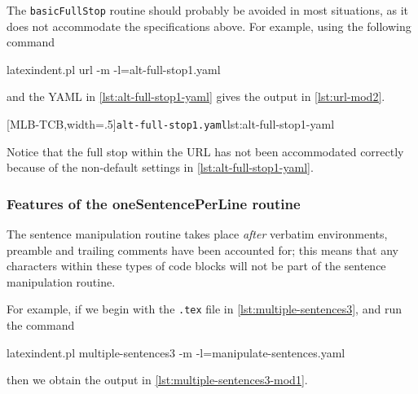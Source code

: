 	The \texttt{basicFullStop} routine should probably be avoided in most situations, as it
	does not accommodate the specifications above. For example, using the following command
	 
	\begin{commandshell}
latexindent.pl url -m -l=alt-full-stop1.yaml
\end{commandshell}
	and the YAML in \cref{lst:alt-full-stop1-yaml} gives the output in \cref{lst:url-mod2}.

	\begin{cmhtcbraster}[ raster left skip=-3.5cm,
			raster right skip=-2cm,
			raster force size=false,
			raster column 1/.style={add to width=.1\textwidth},
			raster column skip=.06\linewidth]
		[MLB-TCB,width=.5\textwidth]{\texttt{alt-full-stop1.yaml}}{lst:alt-full-stop1-yaml}
	\end{cmhtcbraster}

	Notice that the full stop within the URL has not been accommodated correctly because of
	the non-default settings in \cref{lst:alt-full-stop1-yaml}.

\subsubsection{Features of the oneSentencePerLine routine}
	The sentence manipulation routine takes place \emph{after} verbatim  environments, preamble and trailing comments have been
	accounted for; this means that any characters within these types of code blocks will not
	be part of the sentence manipulation routine.

	For example, if we begin with the \texttt{.tex} file in \cref{lst:multiple-sentences3},
	and run the command  
	\begin{commandshell}
latexindent.pl multiple-sentences3 -m -l=manipulate-sentences.yaml
\end{commandshell}
	then we obtain the output in \cref{lst:multiple-sentences3-mod1}.

